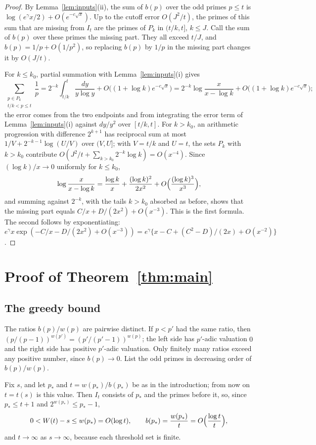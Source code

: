 \documentclass[11pt]{amsart}
\theoremstyle{remark}
\numberwithin{equation}{section}
\begin{document}
\begin{proof}
By Lemma~\ref{lem:inputs}(ii), the sum of $b(p)$ over the odd primes
$p\le t$ is $\log(e^\gamma x/2)+O(e^{-c\sqrt x})$. Up to the cutoff error
$O(J^2/t)$, the primes of this sum that are missing from $I_t$ are the
primes of $P_k$ in $(t/k,t]$, $k\le J$. Call the sum of $b(p)$ over these
primes the missing part. They all exceed $t/J$, and
$b(p)=1/p+O(1/p^2)$, so replacing $b(p)$ by $1/p$ in the missing part
changes it by $O(J/t)$.

For $k\le k_0$, partial summation with Lemma~\ref{lem:inputs}(i) gives
\[
\sum_{\substack{p\in P_k\\ t/k<p\le t}}\frac1p
=2^{-k}\int_{t/k}^{t}\frac{dy}{y\log y}+O\bigl((1+\log k)e^{-c\sqrt x}\bigr)
=2^{-k}\log\frac{x}{x-\log k}+O\bigl((1+\log k)e^{-c\sqrt x}\bigr);
\]
the error comes from the two endpoints and from integrating the error
term of Lemma~\ref{lem:inputs}(i) against $dy/y^2$ over $[t/k,t]$. For
$k>k_0$, an arithmetic progression with difference $2^{k+1}$ has
reciprocal sum at most $1/V+2^{-k-1}\log(U/V)$ over $(V,U]$; with $V=t/k$
and $U=t$,
the sets $P_k$ with $k>k_0$ contribute
$O(J^2/t+\sum_{k>k_0}2^{-k}\log k)=O(x^{-4})$. Since $(\log k)/x\to0$
uniformly for $k\le k_0$,
\[
\log\frac{x}{x-\log k}=\frac{\log k}{x}+\frac{(\log k)^2}{2x^2}
+O\Bigl(\frac{(\log k)^3}{x^3}\Bigr),
\]
and summing against $2^{-k}$, with the tails $k>k_0$ absorbed as before,
shows that the missing part equals $C/x+D/(2x^2)+O(x^{-3})$. This is the
first formula. The second follows by exponentiating:
$e^\gamma x\exp(-C/x-D/(2x^2)+O(x^{-3}))
=e^\gamma\{x-C+(C^2-D)/(2x)+O(x^{-2})\}$.
\end{proof}

\section{Proof of Theorem~\ref{thm:main}}\label{sec:proof}

\subsection*{The greedy bound}
The ratios $b(p)/w(p)$ are pairwise distinct. If $p<p'$ had the same
ratio, then $(p/(p-1))^{w(p')}=(p'/(p'-1))^{w(p)}$; the left side has
$p'$-adic valuation $0$ and the right side has positive $p'$-adic
valuation. Only finitely many ratios exceed any positive number, since
$b(p)\to0$. List the odd primes in decreasing order of $b(p)/w(p)$.

Fix $s$, and let $p_*$ and $t=w(p_*)/b(p_*)$ be as in the introduction; from now on $t=t(s)$ is this value.
Then $I_t$ consists of $p_*$ and the primes before
it, so, since $p_*\le t+1$ and $2^{w(p_*)}\le p_*-1$,
\begin{equation}\label{eq:overflow}
0<W(t)-s\le w(p_*)=O(\log t),\qquad b(p_*)=\frac{w(p_*)}{t}=O\Bigl(\frac{\log t}{t}\Bigr),
\end{equation}
and $t\to\infty$ as $s\to\infty$, because each threshold set is finite.
\end{document}
